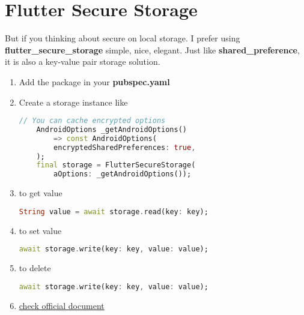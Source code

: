 \section{Flutter Secure Storage}

But if you thinking about secure on local storage.
I prefer using \textbf{flutter\_secure\_storage} simple, nice, elegant.
Just like \textbf{shared\_preference}, 
it is also a key-value pair storage solution.\\


\begin{enumerate}
    \item Add the package in your \textbf{pubspec.yaml} 
    
    \item Create a storage instance like 
\begin{lstlisting}[language=Dart]
    // You can cache encrypted options
    AndroidOptions _getAndroidOptions()
        => const AndroidOptions(
        encryptedSharedPreferences: true,
    );
    final storage = FlutterSecureStorage(
        aOptions: _getAndroidOptions());
\end{lstlisting}

    \item to get value 
    \begin{lstlisting}[language=Dart]
    String value = await storage.read(key: key);
    \end{lstlisting}

    \item to set value  
    \begin{lstlisting}[language=Dart]
      await storage.write(key: key, value: value);
    \end{lstlisting}

    \item to delete 
    \begin{lstlisting}[language=Dart]
        await storage.write(key: key, value: value);
    \end{lstlisting}

    \item \href{ https://pub.dev/packages/flutter_secure_storage}{check official document}
    

\end{enumerate}




 